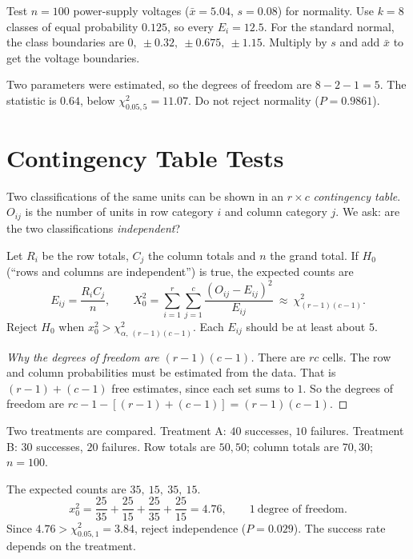 \begin{example}
Test $n=100$ power-supply voltages ($\bar{x}=5.04$, $s=0.08$) for normality. Use $k=8$ classes of equal probability $0.125$, so every $E_i=12.5$. For the standard normal, the class boundaries are $0,\ \pm0.32,\ \pm0.675,\ \pm1.15$. Multiply by $s$ and add $\bar{x}$ to get the voltage boundaries.

Two parameters were estimated, so the degrees of freedom are $8-2-1=5$. The statistic is $0.64$, below $\chi^2_{0.05,5}=11.07$. Do not reject normality ($P=0.9861$).
\end{example}

\section{Contingency Table Tests}

Two classifications of the same units can be shown in an $r\times c$ \emph{contingency table}. $O_{ij}$ is the number of units in row category $i$ and column category $j$. We ask: are the two classifications \emph{independent}?

\begin{theorem}\label{thm:indep}
Let $R_i$ be the row totals, $C_j$ the column totals and $n$ the grand total. If $H_0$ (``rows and columns are independent'') is true, the expected counts are
\[ E_{ij}=\frac{R_iC_j}{n},\qquad X_0^2=\sum_{i=1}^r\sum_{j=1}^c\frac{(O_{ij}-E_{ij})^2}{E_{ij}}\ \approx\ \chi^2_{(r-1)(c-1)}. \]
Reject $H_0$ when $x_0^2>\chi^2_{\alpha,\,(r-1)(c-1)}$. Each $E_{ij}$ should be at least about $5$.
\end{theorem}

\begin{proof}[Why the degrees of freedom are $(r-1)(c-1)$]
There are $rc$ cells. The row and column probabilities must be estimated from the data. That is $(r-1)+(c-1)$ free estimates, since each set sums to $1$. So the degrees of freedom are $rc-1-[(r-1)+(c-1)]=(r-1)(c-1)$.
\end{proof}

\begin{example}\label{ex:cont}
Two treatments are compared. Treatment A: $40$ successes, $10$ failures. Treatment B: $30$ successes, $20$ failures. Row totals are $50,50$; column totals are $70,30$; $n=100$.

The expected counts are $35,\ 15,\ 35,\ 15$.
\[ x_0^2=\frac{25}{35}+\frac{25}{15}+\frac{25}{35}+\frac{25}{15}=4.76,\qquad 1\ \text{degree of freedom}. \]
Since $4.76>\chi^2_{0.05,1}=3.84$, reject independence ($P=0.029$). The success rate depends on the treatment.
\end{example}

